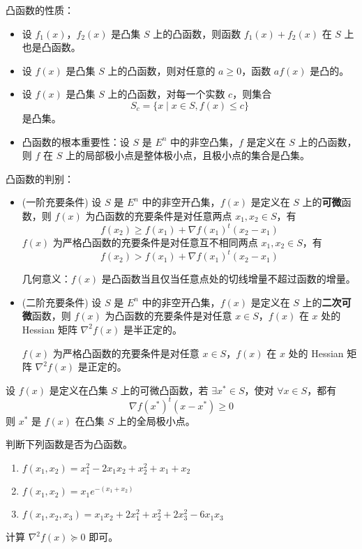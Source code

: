 \begin{theorem}
    凸函数的性质：
    \begin{itemize}
        \item 设 $f_1(x)$，$f_2(x)$ 是凸集 $S$ 上的凸函数，则函数 $f_1(x) + f_2(x)$ 在 $S$ 上也是凸函数。
        \item 设 $f(x)$ 是凸集 $S$ 上的凸函数，则对任意的 $a \ge 0$，函数 $af(x)$ 是凸的。
        \item 设 $f(x)$ 是凸集 $S$ 上的凸函数，对每一个实数 $c$，则集合 
        \[
            S_c = \{x \mid x \in S, f(x) \le c\}  
        \]
        是凸集。
        \item 凸函数的根本重要性：设 $S$ 是 $E^n$ 中的非空凸集，$f$ 是定义在 $S$ 上的凸函数，则 $f$ 在 $S$ 上的局部极小点是整体极小点，且极小点的集合是凸集。
    \end{itemize}
\end{theorem}

\begin{theorem}
    凸函数的判别：
    \begin{itemize}
        \item (一阶充要条件) 设 $S$ 是 $E^n$ 中的非空开凸集，$f(x)$ 是定义在 $S$ 上的\textbf{可微}函数，则 $f(x)$ 为凸函数的充要条件是对任意两点 $x_1, x_2 \in S$，有 \[f(x_2) \ge f(x_1) + \nabla f(x_1)^t(x_2 - x_1)\]
        $f(x)$ 为严格凸函数的充要条件是对任意互不相同两点 $x_1, x_2 \in S$，有 \[f(x_2) > f(x_1) + \nabla f(x_1)^t(x_2 - x_1)\]

        几何意义：$f(x)$ 是凸函数当且仅当任意点处的切线增量不超过函数的增量。
        \item (二阶充要条件) 设 $S$ 是 $E^n$ 中的非空开凸集，$f(x)$ 是定义在 $S$ 上的\textbf{二次可微}函数，则 $f(x)$ 为凸函数的充要条件是对任意 $x \in S$，$f(x)$ 在 $x$ 处的 Hessian 矩阵 $\nabla ^2f(x)$ 是半正定的。
        
        $f(x)$ 为严格凸函数的充要条件是对任意 $x \in S$，$f(x)$ 在 $x$ 处的 Hessian 矩阵 $\nabla ^2f(x)$ 是正定的。
    \end{itemize}
\end{theorem}

\begin{note}
    设 $f(x)$ 是定义在凸集 $S$ 上的可微凸函数，若 $\exists x^* \in S$，使对 $\forall x \in S$，都有 \[\nabla f(x^*)^t(x - x^*) \ge 0\]
    则 $x^*$ 是 $f(x)$ 在凸集 $S$ 上的全局极小点。
\end{note}

\begin{example}
    判断下列函数是否为凸函数。
    \begin{enumerate}
        \item $f(x_1, x_2) = x_1^2 - 2x_1x_2 + x_2^2 + x_1 + x_2$
        \item $f(x_1, x_2) = x_1e^{-(x_1 + x_2)}$
        \item $f(x_1, x_2, x_3) = x_1x_2 + 2x_1^2 + x_2^2 + 2x_3^2 - 6x_1x_3$
    \end{enumerate}
    \answer 计算 $\nabla^2f(x) \succeq 0$ 即可。
\end{example}

